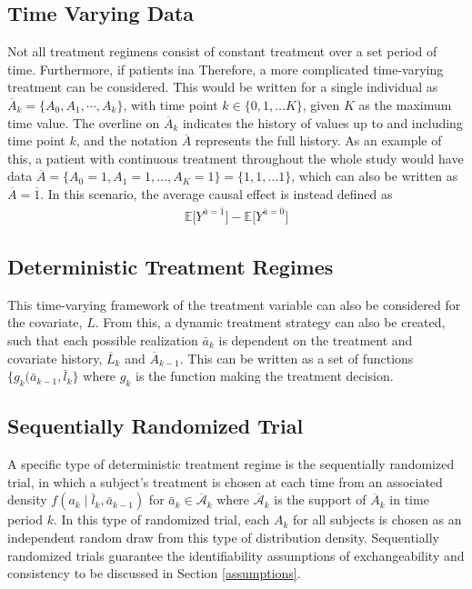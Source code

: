 \subsection{Time Varying Data} \label{Time-varying}
Not all treatment regimens consist of constant treatment over a set period of time.  Furthermore, if patients ina Therefore, a more complicated time-varying treatment can be considered.  This would be written for a single individual as $\overline{A}_k = \{A_0, A_1, \cdots, A_k \}$, with time point $k \in \{ 0, 1, \dots K\}$, given $K$ as the maximum time value.  The overline on $\overline{A}_k$ indicates the history of values up to and including time point $k$, and the notation $\overline{A}$ represents the full history.  As an example of this, a patient with continuous treatment throughout the whole study would have data $\overline{A} = \{A_0 = 1, A_1 = 1, \dots, A_K = 1 \}  = \{1,1,\dots 1 \}$, which can also be written as $\overline{A} = \overline{1}$.  In this scenario, the average causal effect is instead defined as 
\begin{align} \mathbb{E}\bigg[Y^{\bar{a} = \bar{1}}\bigg] -  \mathbb{E}\bigg[Y^{\bar{a} = \bar{0}}\bigg] \end{align} 

\subsection{Deterministic Treatment Regimes} 
This time-varying framework of the treatment variable can also be considered for the covariate, $L$.  From this, a dynamic treatment strategy can also be created, such that each possible realization $\bar{a}_{k}$ is dependent on the treatment and covariate history, $\overline{L}_k$ and $\overline{A}_{k-1}$.  This can be written as a set of functions $\{g_k (\bar{a}_{k-1}, \bar{l}_k \}$ where $g_k$ is the function making the treatment decision.  


\subsection{Sequentially Randomized Trial} 
A specific type of deterministic treatment regime is the sequentially randomized trial, in which a subject's treatment is chosen at each time from an associated density $f (a_k \mid \bar{l}_k, \bar{a}_{k-1})$ for $\bar{a}_k \in \overline{\mathcal{A}}_k$ where $\overline{\mathcal{A}}_k$ is the support of $\overline{A}_k$ in time period $k$.\cite{young2011comparative}  In this type of randomized trial, each $A_k$ for all subjects is chosen as an independent random draw from this type of distribution density.  Sequentially randomized trials guarantee the identifiability assumptions of exchangeability and consistency to be discussed in Section \ref{assumptions}.  

